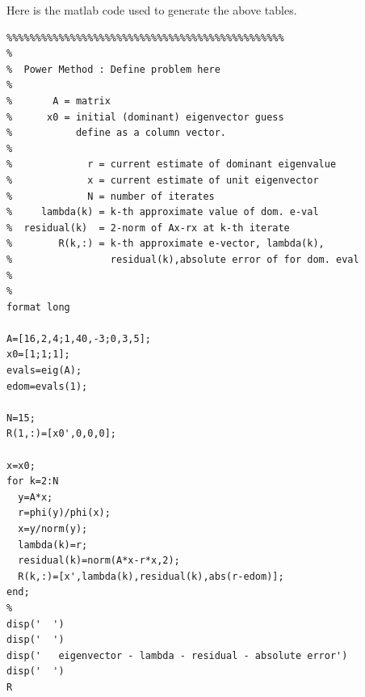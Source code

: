 \documentclass[11pt]{article}
\begin{document}
Here is the matlab code used to generate the above tables.
\begin{Verbatim}
%%%%%%%%%%%%%%%%%%%%%%%%%%%%%%%%%%%%%%%%%%%%%%%%
%
%  Power Method : Define problem here
%
%       A = matrix
%      x0 = initial (dominant) eigenvector guess
%           define as a column vector.
%
%             r = current estimate of dominant eigenvalue
%             x = current estimate of unit eigenvector
%             N = number of iterates
%     lambda(k) = k-th approximate value of dom. e-val
%  residual(k)  = 2-norm of Ax-rx at k-th iterate
%        R(k,:) = k-th approximate e-vector, lambda(k),
%                 residual(k),absolute error of for dom. eval
%
%
format long

A=[16,2,4;1,40,-3;0,3,5];
x0=[1;1;1];
evals=eig(A);
edom=evals(1);

N=15;
R(1,:)=[x0',0,0,0];

x=x0;
for k=2:N
  y=A*x;
  r=phi(y)/phi(x);
  x=y/norm(y);
  lambda(k)=r;
  residual(k)=norm(A*x-r*x,2);
  R(k,:)=[x',lambda(k),residual(k),abs(r-edom)];
end;
%
disp('  ')
disp('  ')
disp('   eigenvector - lambda - residual - absolute error')
disp('  ')
R
\end{Verbatim}

\newpage

\newcommand{\matA}{\begin{bmatrix} 2 & 1/4 \\ 1/4 & 1/2 \end{bmatrix}}
\newcommand{\vectorb}{\begin{pmatrix} 1 \\ 2 \end{pmatrix}}
\newcommand{\xnaught}{\begin{pmatrix} 0 \\ 0 \end{pmatrix}}
\newcommand{\rnaught}{\begin{pmatrix} -1 \\ -2 \end{pmatrix}}
\newcommand{\rnaughtT}{\begin{pmatrix} -1 & - 2 \end{pmatrix}}
\newcommand{\xone}{\begin{pmatrix} 1 \\ 2 \end{pmatrix}}
\newcommand{\rone}{\begin{pmatrix} 3/2 \\ -3/4 \end{pmatrix}}
\newcommand{\roneT}{\begin{pmatrix} 3/2 & -3/4 \end{pmatrix}}
\newcommand{\xtwo}{\begin{pmatrix} 0 \\ 5/2 \end{pmatrix}}
\end{document}
